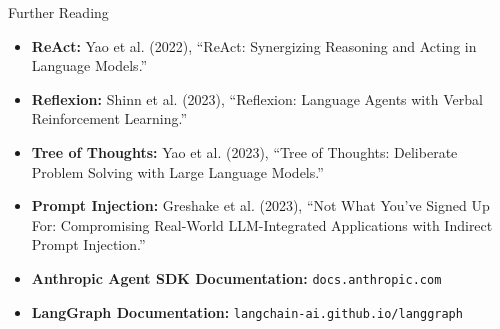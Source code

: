 \documentclass{beamer}       %
\begin{document}
\begin{frame}{Further Reading}
    \begin{itemize}
        \item \textbf{ReAct:} Yao et al. (2022), ``ReAct: Synergizing Reasoning and Acting in Language Models.''
        \item \textbf{Reflexion:} Shinn et al. (2023), ``Reflexion: Language Agents with Verbal Reinforcement Learning.''
        \item \textbf{Tree of Thoughts:} Yao et al. (2023), ``Tree of Thoughts: Deliberate Problem Solving with Large Language Models.''
        \item \textbf{Prompt Injection:} Greshake et al. (2023), ``Not What You've Signed Up For: Compromising Real-World LLM-Integrated Applications with Indirect Prompt Injection.''
        \item \textbf{Anthropic Agent SDK Documentation:} \texttt{docs.anthropic.com}
        \item \textbf{LangGraph Documentation:} \texttt{langchain-ai.github.io/langgraph}
    \end{itemize}
\end{frame}
\end{document}
